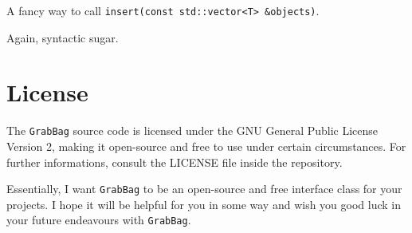 \documentclass[a4paper,12pt]{article}
\begin{document}
A fancy way to call \texttt{insert(const std::vector<T> \&objects)}.

Again, syntactic sugar.

\newpage

\section{License}

The \texttt{GrabBag} source code is licensed under the GNU General Public License Version 2, making it open-source and free to use under certain circumstances. 
For further informations, consult the LICENSE file inside the repository.

Essentially, I want \texttt{GrabBag} to be an open-source and free interface class for your projects.
I hope it will be helpful for you in some way and wish you good luck in your future endeavours with \texttt{GrabBag}.
\end{document}
